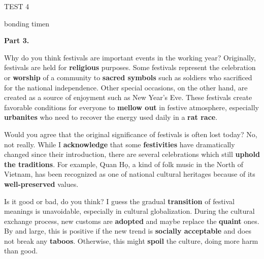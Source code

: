\begin{glossarymc}[Cambridge 5]
\begin{test}{TEST 4}
\begin{VocabExplain}[Part 2]
            \begin{ExplainCard}{bonding time}{n}
            \end{ExplainCard}
        \end{VocabExplain}

    \noindent
    \textbf{Part 3.}
    \begin{qa}{Why do you think festivals are important events in the working year?}
    Originally, festivals are held for \textbf{religious} purposes. Some festivals represent the celebration or \textbf{worship} of a community to \textbf{sacred symbols} such as soldiers who sacrificed for the national independence. Other special occasions, on the other hand, are created as a source of enjoyment such as New Year’s Eve. These festivals create favorable conditions for everyone to \textbf{mellow out} in festive atmosphere, especially \textbf{urbanites} who need to recover the energy used daily in a \textbf{rat race}.
    \end{qa}

    \begin{qa}{Would you agree that the original significance of festivals is often lost today?}
    No, not really. While I \textbf{acknowledge} that some \textbf{festivities} have dramatically changed since their introduction, there are several celebrations which still \textbf{uphold the traditions}. For example, Quan Họ, a kind of folk music in the North of Vietnam, has been recognized as one of national cultural heritages because of its \textbf{well-preserved} values.
    \end{qa}

    \begin{qa}{Is it good or bad, do you think?}
    I guess the gradual \textbf{transition} of festival meanings is unavoidable, especially in cultural globalization. During the cultural exchange process, new customs are \textbf{adopted} and maybe replace the \textbf{quaint} ones. By and large, this is positive if the new trend is \textbf{socially acceptable} and does not break any \textbf{taboos}. Otherwise, this might \textbf{spoil} the culture, doing more harm than good.
    \end{qa}


\end{test}
\end{glossarymc}
